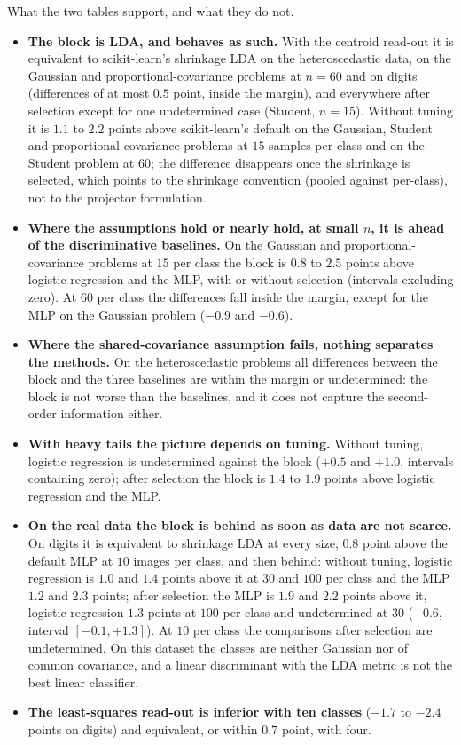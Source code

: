 \documentclass[11pt,a4paper]{article}
\theoremstyle{plain}
\theoremstyle{definition}
\theoremstyle{remark}
\begin{document}
What the two tables support, and what they do not.
\begin{itemize}
  \item \textbf{The block is LDA, and behaves as such.} With the centroid
  read-out it is equivalent to scikit-learn's shrinkage LDA on the
  heteroscedastic data, on the Gaussian and proportional-covariance
  problems at $n=60$ and on digits (differences of at most $0.5$ point,
  inside the margin), and everywhere after selection except for one
  undetermined case (Student, $n=15$). Without tuning it is $1.1$ to $2.2$ points above
  scikit-learn's default on the Gaussian, Student and
  proportional-covariance problems at $15$ samples per class and on the
  Student problem at $60$; the difference disappears once the shrinkage is
  selected, which points to the shrinkage convention (pooled against
  per-class), not to the projector formulation.
  \item \textbf{Where the assumptions hold or nearly hold, at small $n$, it
  is ahead of the discriminative baselines.} On the Gaussian and
  proportional-covariance problems at $15$ per class the block is $0.8$ to
  $2.5$ points above logistic regression and the MLP, with or without
  selection (intervals excluding zero). At $60$ per class the differences
  fall inside the margin, except for the MLP on the Gaussian problem
  ($-0.9$ and $-0.6$).
  \item \textbf{Where the shared-covariance assumption fails, nothing
  separates the methods.} On the heteroscedastic problems all differences
  between the block and the three baselines are within the margin or
  undetermined: the block is not worse than the baselines, and it does not
  capture the second-order information either.
  \item \textbf{With heavy tails the picture depends on tuning.} Without
  tuning, logistic regression is undetermined against the block ($+0.5$ and
  $+1.0$, intervals containing zero); after selection the block is $1.4$ to
  $1.9$ points above logistic regression and the MLP.
  \item \textbf{On the real data the block is behind as soon as data are
  not scarce.} On digits it is equivalent to shrinkage LDA at every size,
  $0.8$ point above the default MLP at $10$ images per class, and then
  behind: without tuning, logistic regression is $1.0$ and $1.4$ points
  above it at $30$ and $100$ per class and the MLP $1.2$ and $2.3$ points;
  after selection the MLP is $1.9$ and $2.2$ points above it, logistic
  regression $1.3$ points at $100$ per class and undetermined at $30$
  ($+0.6$, interval $[-0.1,+1.3]$). At $10$ per class the comparisons after
  selection are undetermined. On this dataset the classes are neither
  Gaussian nor of common covariance, and a linear discriminant with the
  LDA metric is not the best linear classifier.
  \item \textbf{The least-squares read-out is inferior with ten classes}
  ($-1.7$ to $-2.4$ points on digits) and equivalent, or within $0.7$
  point, with four.
\end{itemize}
\end{document}
